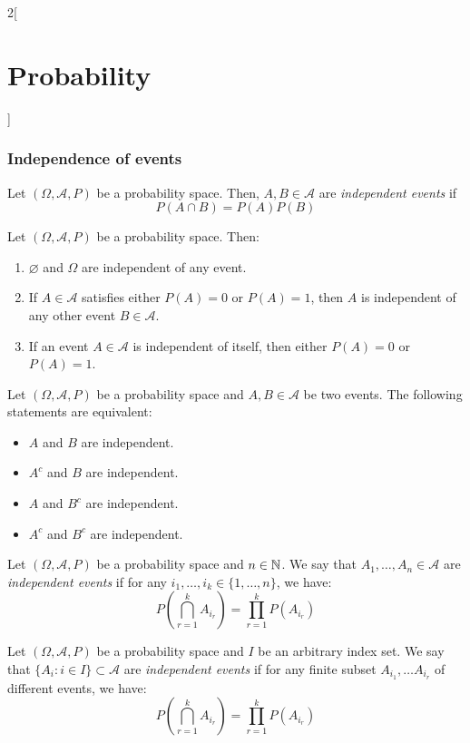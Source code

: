 \documentclass[../../../main.tex]{subfiles}
\begin{document}
\begin{multicols}{2}[\section{Probability}]
  \subsubsection*{Independence of events}
  \begin{definition}
    Let $(\Omega,\mathcal{A},P)$ be a probability space. Then, $A,B\in\mathcal{A}$ are \textit{independent events} if $$P(A\cap B)=P(A)P(B)$$
  \end{definition}
  \begin{prop}
    Let $(\Omega,\mathcal{A},P)$ be a probability space. Then:
    \begin{enumerate}
      \item $\varnothing$ and $\Omega$ are independent of any event.
      \item If $A\in\mathcal{A}$ satisfies either $P(A)=0$ or $P(A)=1$, then $A$ is independent of any other event $B\in\mathcal{A}$.
      \item If an event $A\in\mathcal{A}$ is independent of itself, then either $P(A)=0$ or $P(A)=1$.
    \end{enumerate}
  \end{prop}
  \begin{prop}
    Let $(\Omega,\mathcal{A},P)$ be a probability space and $A,B\in\mathcal{A}$ be two events. The following statements are equivalent:
    \begin{itemize}
      \item $A$ and $B$ are independent.
      \item $A^c$ and $B$ are independent.
      \item $A$ and $B^c$ are independent.
      \item $A^c$ and $B^c$ are independent.
    \end{itemize}
  \end{prop}
  \begin{definition}
    Let $(\Omega,\mathcal{A},P)$ be a probability space and $n\in\mathbb{N}$. We say that $A_1,\ldots,A_n\in\mathcal{A}$ are \textit{independent events} if for any $i_1,\ldots,i_k\in\{1,\ldots,n\}$, we have: $$P\left(\bigcap_{r=1}^kA_{i_r}\right)=\prod_{r=1}^kP(A_{i_r})$$
  \end{definition}
  \begin{definition}
    Let $(\Omega,\mathcal{A},P)$ be a probability space and $I$ be an arbitrary index set. We say that $\{A_i:i\in I\}\subset\mathcal{A}$ are \textit{independent events} if for any finite subset $A_{i_1},\ldots A_{i_r}$ of different events, we have: $$P\left(\bigcap_{r=1}^kA_{i_r}\right)=\prod_{r=1}^kP(A_{i_r})$$
  \end{definition}

\end{multicols}
\end{document}

